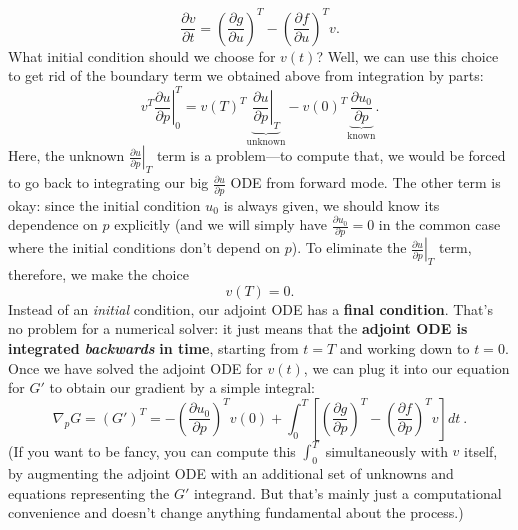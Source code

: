 \[
\boxed{\frac{\partial v}{\partial t}=\left(\frac{\partial g}{\partial u}\right)^{T} - \left(\frac{\partial f}{\partial u}\right)^{T}v}.
\]
What initial condition should we choose
for $v(t)$? Well, we can use this choice to get rid of the boundary
term we obtained above from integration by parts: 
\[
\left.v^{T}\frac{\partial u}{\partial p}\right|_{0}^{T}=v(T)^{T}\underbrace{\left.\frac{\partial u}{\partial p}\right|_{T}}_{\text{unknown}}-v(0)^{T}\underbrace{\frac{\partial u_{0}}{\partial p}}_{\text{known}}.
\]
Here, the unknown $\left.\frac{\partial u}{\partial p}\right|_{T}$
term is a problem---to compute that, we would be forced to go back
to integrating our big $\frac{\partial u}{\partial p}$ ODE from forward
mode. The other term is okay: since the initial condition $u_{0}$
is always given, we should know its dependence on $p$ explicitly
(and we will simply have $\frac{\partial u_{0}}{\partial p}=0$ in
the common case where the initial conditions don't depend on $p$).
To eliminate the $\left.\frac{\partial u}{\partial p}\right|_{T}$
term, therefore, we make the choice 
\[
\boxed{v(T)=0}.
\]
Instead of an \emph{initial} condition, our adjoint ODE has a \textbf{final
condition}. That's no problem for a numerical solver: it just means
that the \textbf{adjoint ODE is integrated }\textbf{\emph{backwards}}\textbf{
in time}, starting from $t=T$ and working down to $t=0$. Once we
have solved the adjoint ODE for $v(t)$, we can plug it into our equation
for $G'$ to obtain our gradient by a simple integral:
\[
\nabla_{p}G=\left(G'\right)^{T}=-\left(\frac{\partial u_{0}}{\partial p}\right)^{T}v(0)+\int_{0}^{T}\left[\left(\frac{\partial g}{\partial p}\right)^{T}-\left(\frac{\partial f}{\partial p}\right)^{T}v\right]dt\:.
\]
(If you want to be fancy, you can compute this $\int_{0}^{T}$ simultaneously
with $v$ itself, by augmenting the adjoint ODE with an additional
set of unknowns and equations representing the $G'$ integrand. But
that's mainly just a computational convenience and doesn't change
anything fundamental about the process.)

